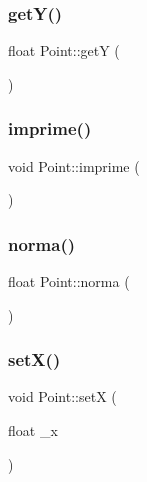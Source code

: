 \mbox{\label{class_point_a3cccbca94719ddde353cce86ce0e2f64}} 
\subsubsection{\texorpdfstring{get\+Y()}{getY()}}
{\footnotesize\ttfamily float Point\+::getY (\begin{DoxyParamCaption}{ }\end{DoxyParamCaption})}

\mbox{\label{class_point_a1fb5c2501c27ab2cbc99d06c2a26a741}} 
\subsubsection{\texorpdfstring{imprime()}{imprime()}}
{\footnotesize\ttfamily void Point\+::imprime (\begin{DoxyParamCaption}{ }\end{DoxyParamCaption})}

\mbox{\label{class_point_abd2618d1f505d9392893273a66e7c9b2}} 
\subsubsection{\texorpdfstring{norma()}{norma()}}
{\footnotesize\ttfamily float Point\+::norma (\begin{DoxyParamCaption}{ }\end{DoxyParamCaption})}

\mbox{\label{class_point_a428a1676e2fdec6753c42011a1d59d18}} 
\subsubsection{\texorpdfstring{set\+X()}{setX()}}
{\footnotesize\ttfamily void Point\+::setX (\begin{DoxyParamCaption}\item[{float}]{\+\_\+x }\end{DoxyParamCaption})}

\mbox{\label{class_point_ab5385c6d9bfa841e641e4709fc9f14cc}} 
